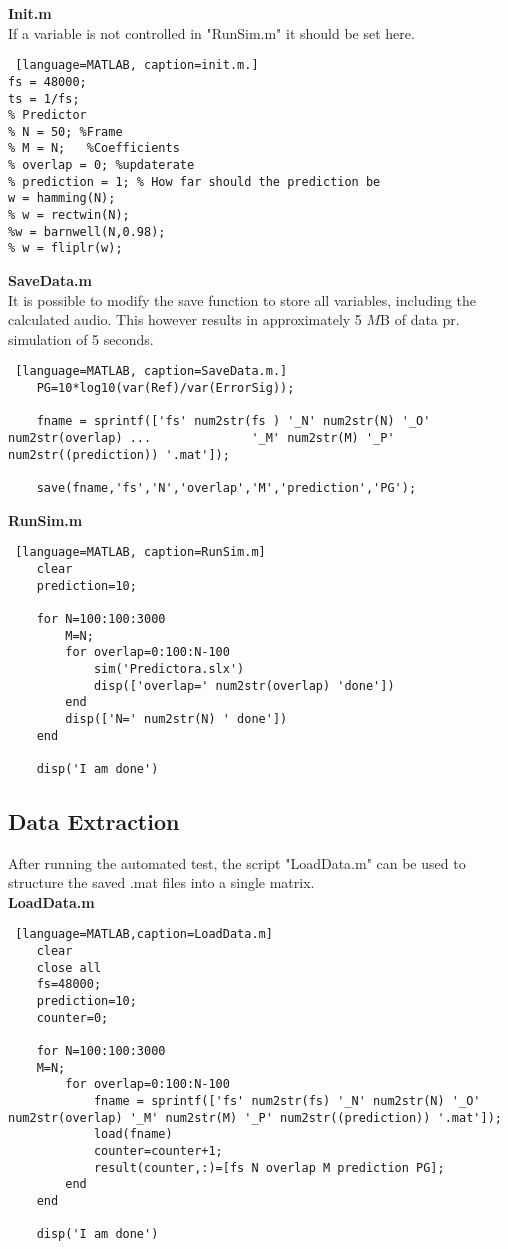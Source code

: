 \textbf{Init.m}\\
If a variable is not controlled in "RunSim.m" it should be set here. 
\begin{lstlisting} [language=MATLAB, caption=init.m.]
fs = 48000;
ts = 1/fs; 
% Predictor 
% N = 50; %Frame
% M = N;   %Coefficients
% overlap = 0; %updaterate
% prediction = 1; % How far should the prediction be
w = hamming(N); 
% w = rectwin(N);
%w = barnwell(N,0.98);
% w = fliplr(w);
\end{lstlisting}

\textbf{SaveData.m}\\
It is possible to modify the save function to store all variables, including the calculated audio. This however results in approximately 5 $M$B of data pr. simulation of 5 seconds.  
\begin{lstlisting} [language=MATLAB, caption=SaveData.m.]
	PG=10*log10(var(Ref)/var(ErrorSig));
	
	fname = sprintf(['fs' num2str(fs ) '_N' num2str(N) '_O' num2str(overlap) ...              '_M' num2str(M) '_P' num2str((prediction)) '.mat']);
	
	save(fname,'fs','N','overlap','M','prediction','PG');
\end{lstlisting}

\textbf{RunSim.m}
\begin{lstlisting} [language=MATLAB, caption=RunSim.m]
	clear 
	prediction=10;
	
	for N=100:100:3000
		M=N;
		for overlap=0:100:N-100
			sim('Predictora.slx')
			disp(['overlap=' num2str(overlap) 'done'])
		end
		disp(['N=' num2str(N) ' done'])
	end
	
	disp('I am done')	
\end{lstlisting}

\subsection{Data Extraction}
After running the automated test, the script "LoadData.m" can be used to structure the saved .mat files into a single matrix.\\
\textbf{LoadData.m}
\begin{lstlisting} [language=MATLAB,caption=LoadData.m]
	clear
	close all
	fs=48000;
	prediction=10;
	counter=0;
	
	for N=100:100:3000
	M=N;
		for overlap=0:100:N-100
			fname = sprintf(['fs' num2str(fs) '_N' num2str(N) '_O' num2str(overlap) '_M' num2str(M) '_P' num2str((prediction)) '.mat']);
			load(fname)
			counter=counter+1;
			result(counter,:)=[fs N overlap M prediction PG]; 
		end
	end
	
	disp('I am done')
\end{lstlisting}

